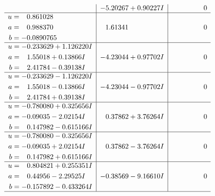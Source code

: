 \documentclass[1p]{elsarticle_modified}
\theoremstyle{definition}
\begin{document}
$$\begin{array}{c|c|c}
 & -5.20267 + 0.90227 I & \phantom{-0.000000 } 0 \\ \hline\begin{aligned}
u &= \phantom{-}0.861028\phantom{ +0.000000I} \\
a &= \phantom{-}0.988370\phantom{ +0.000000I} \\
b &= -0.0890765\phantom{ +0.000000I}\end{aligned}
 & \phantom{-}1.61341\phantom{ +0.000000I} & \phantom{-0.000000 } 0 \\ \hline\begin{aligned}
u &= -0.233629 + 1.126220 I \\
a &= \phantom{-}1.55018 + 0.13866 I \\
b &= \phantom{-}2.41784 - 0.39138 I\end{aligned}
 & -4.23044 + 0.97702 I & \phantom{-0.000000 } 0 \\ \hline\begin{aligned}
u &= -0.233629 - 1.126220 I \\
a &= \phantom{-}1.55018 - 0.13866 I \\
b &= \phantom{-}2.41784 + 0.39138 I\end{aligned}
 & -4.23044 - 0.97702 I & \phantom{-0.000000 } 0 \\ \hline\begin{aligned}
u &= -0.780080 + 0.325656 I \\
a &= -0.09035 - 2.02154 I \\
b &= \phantom{-}0.147982 - 0.615166 I\end{aligned}
 & \phantom{-}0.37862 + 3.76264 I & \phantom{-0.000000 } 0 \\ \hline\begin{aligned}
u &= -0.780080 - 0.325656 I \\
a &= -0.09035 + 2.02154 I \\
b &= \phantom{-}0.147982 + 0.615166 I\end{aligned}
 & \phantom{-}0.37862 - 3.76264 I & \phantom{-0.000000 } 0 \\ \hline\begin{aligned}
u &= \phantom{-}0.804821 + 0.255351 I \\
a &= \phantom{-}0.44956 - 2.29525 I \\
b &= -0.157892 - 0.433264 I\end{aligned}
 & -0.38569 - 9.16610 I & \phantom{-0.000000 } 0\\
 \hline 
 \end{array}$$\newpage$$\begin{array}{c|c|c}  

\end{array}$$
\end{document}
